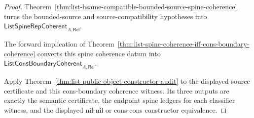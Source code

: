 \begin{proof}
Theorem~\ref{thm:list-hsame-compatible-bounded-source-spine-coherence} turns the
bounded-source and source-compatibility hypotheses into
$\mathsf{ListSpineRepCoherent}_{A,\mathsf{Rel}}$.

The forward implication of
Theorem~\ref{thm:list-spine-coherence-iff-cons-boundary-coherence} converts this
spine coherence datum into
$\mathsf{ListConsBoundaryCoherent}_{A,\mathsf{Rel}}$.

Apply Theorem~\ref{thm:list-public-object-constructor-audit} to the displayed
source certificate and this cons-boundary coherence witness. Its three outputs
are exactly the semantic certificate, the endpoint spine ledgers for each
classifier witness, and the displayed nil-nil or cons-cons constructor
equivalence.
\end{proof}

